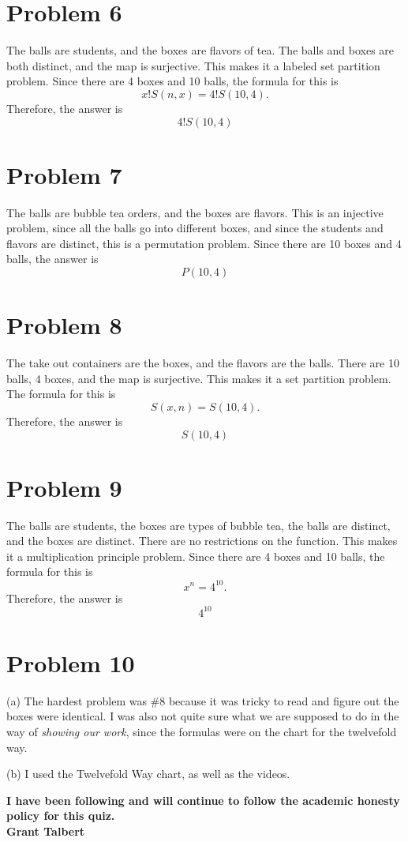 \documentclass[11pt, letterpaper]{report}
\begin{document}
\section*{Problem 6}
The balls are students, and the boxes are flavors of tea. The balls and boxes are both distinct, and the map is surjective. This makes it a labeled set partition problem. Since there are 4 boxes and 10 balls, the formula for this is
\[
	x!S(n,x)=4!S(10,4)
.\]
Therefore, the answer is
\[
	\boxed{4!S(10,4)}
\]
\section*{Problem 7}
The balls are bubble tea orders, and the boxes are flavors. This is an injective problem, since all the balls go into different boxes, and since the students and flavors are distinct, this is a permutation problem. Since there are 10 boxes and 4 balls, the answer is
\[
	\boxed{P(10,4)}
\]
\section*{Problem 8}
The take out containers are the boxes, and the flavors are the balls. There are 10 balls, 4 boxes, and the map is surjective. This makes it a set partition problem. The formula for this is
\[
	S(x,n)=S(10,4)
.\]
Therefore, the answer is
\[
	\boxed{S(10,4)}
\]
\section*{Problem 9}
The balls are students, the boxes are types of bubble tea, the balls are distinct, and the boxes are distinct. There are no restrictions on the function. This makes it a multiplication principle problem. Since there are 4 boxes and 10 balls, the formula for this is
\[
	x^n=4^{10}
.\]
Therefore, the answer is
\[
	\boxed{4^{10}}
\]

\section*{Problem 10}
(a) The hardest problem was \#8 because it was tricky to read and figure out the boxes were identical. I was also not quite sure what we are supposed to do in the way of \emph{showing our work}, since the formulas were on the chart for the twelvefold way.

\noindent(b) I used the Twelvefold Way chart, as well as the videos.

\begin{center}\bfseries
	I have been following and will continue to follow the academic honesty policy for this quiz.\\
	Grant Talbert
\end{center}
\end{document}
